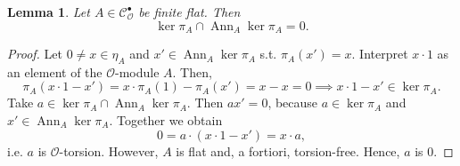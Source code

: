 \documentclass{article}
\theoremstyle{plain}%
\newtheorem{lemma}[theorem]{Lemma}
\theoremstyle{definition}
\theoremstyle{remark}
\newcommand{\cob}{\mathcal{C}_\mathcal{O}^\bullet}
\newcommand{\ann}{\operatorname{Ann}}
\begin{document}
\begin{lemma}\label{lem:intersectionzero}
    Let \(A \in \cob\) be finite flat. Then
    \[
        \ker \pi_A \cap \ann_A \ker \pi_A = 0.  
    \]
\end{lemma}
\begin{proof}
    Let \(0 \neq x \in \eta_A\) and \(x' \in \ann_A \ker \pi_A\) s.t. \(\pi_A(x') = x\).
    Interpret \(x \cdot 1\) as an element of the \(\mathcal{O}\)-module \(A\). Then,
    \[
        \pi_A(x \cdot 1 - x') = x\cdot \pi_A(1) - \pi_A(x') = x - x = 0 \implies x \cdot 1 - x' \in \ker \pi_A.
    \]
    Take \(a \in \ker \pi_A \cap \ann_A \ker \pi_A\). Then \(ax' = 0\), because \(a\in \ker \pi_A\) 
    and \(x' \in \ann_A \ker \pi_A\). Together we obtain
    \[
        0 = a \cdot (x\cdot 1 - x') = x \cdot a,
    \]
    i.e. \(a\) is \(\mathcal{O}\)-torsion. However, \(A\) is flat and, a fortiori, torsion-free. Hence,
    \(a\) is 0.
\end{proof}
\end{document}
